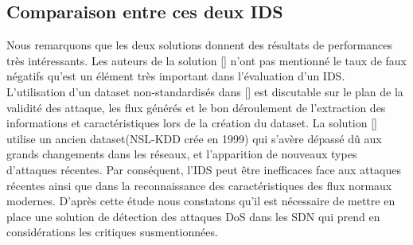 \subsection{Comparaison entre ces deux IDS}
Nous remarquons que les deux solutions donnent des résultats de performances très intéressants. Les auteurs de la solution [\cite{8}] n’ont pas mentionné le taux de faux négatifs qu’est un élément très important dans l’évaluation d’un IDS. L’utilisation d’un dataset non-standardisés dans [\cite{8}] est discutable sur le plan de la validité des attaque, les flux générés et le bon déroulement de l’extraction des informations et caractéristiques lors de la création du dataset. La solution [\cite{10}] utilise un ancien dataset(NSL-KDD crée en 1999) qui s’avère dépassé dû aux grands changements dans les réseaux, et l’apparition de nouveaux types d’attaques récentes. Par conséquent, l’IDS peut être inefficaces face aux attaques récentes ainsi que dans la reconnaissance des caractéristiques des flux normaux modernes.
D’après cette étude nous constatons qu’il est nécessaire de mettre en place une solution de détection des attaques DoS dans les SDN qui prend en considérations les critiques susmentionnées. 

